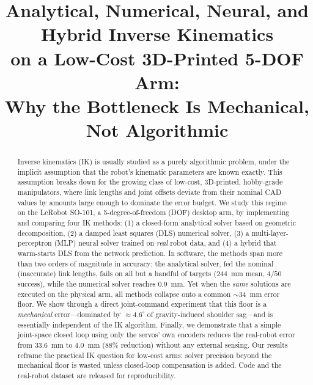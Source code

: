 \documentclass[conference]{IEEEtran}
\begin{document}
\title{Analytical, Numerical, Neural, and Hybrid Inverse Kinematics\\
on a Low-Cost 3D-Printed 5-DOF Arm:\\
Why the Bottleneck Is Mechanical, Not Algorithmic}

\author{
}

\maketitle

\begin{abstract}
Inverse kinematics (IK) is usually studied as a purely algorithmic problem, under the implicit assumption that the robot's kinematic parameters are known exactly. This assumption breaks down for the growing class of low-cost, 3D-printed, hobby-grade manipulators, where link lengths and joint offsets deviate from their nominal CAD values by amounts large enough to dominate the error budget. We study this regime on the LeRobot SO-101, a 5-degree-of-freedom (DOF) desktop arm, by implementing and comparing four IK methods: (1) a closed-form analytical solver based on geometric decomposition, (2) a damped least squares (DLS) numerical solver, (3) a multi-layer-perceptron (MLP) neural solver trained on \emph{real} robot data, and (4) a hybrid that warm-starts DLS from the network prediction. In software, the methods span more than two orders of magnitude in accuracy: the analytical solver, fed the nominal (inaccurate) link lengths, fails on all but a handful of targets ($244$~mm mean, $4/50$ success), while the numerical solver reaches $0.9$~mm. Yet when the \emph{same} solutions are executed on the physical arm, all methods collapse onto a common $\sim\!34$~mm error floor. We show through a direct joint-command experiment that this floor is a \emph{mechanical} error---dominated by $\approx\!4.6^{\circ}$ of gravity-induced shoulder sag---and is essentially independent of the IK algorithm. Finally, we demonstrate that a simple joint-space closed loop using only the servos' own encoders reduces the real-robot error from $33.6$~mm to $4.0$~mm ($88\%$ reduction) without any external sensing. Our results reframe the practical IK question for low-cost arms: solver precision beyond the mechanical floor is wasted unless closed-loop compensation is added. Code and the real-robot dataset are released for reproducibility.
\end{abstract}
\end{document}
